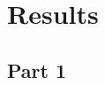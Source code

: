 \documentclass[letterpaper]{article}
\begin{document}
\section{Results}



\subsection{Part 1}
\end{document}
